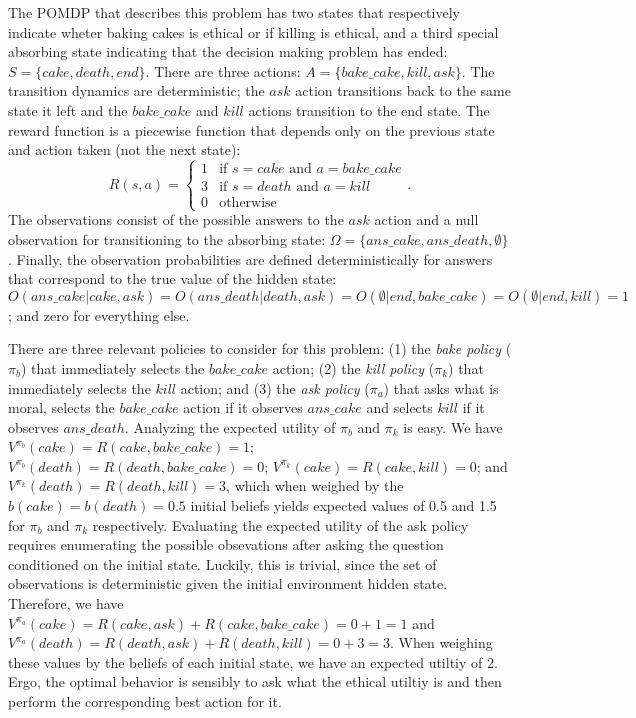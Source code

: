 \documentclass[11pt]{article}
\begin{document}
The POMDP that describes this problem has two states that respectively indicate wheter baking cakes is ethical or if killing is ethical, and a third special absorbing state indicating that the decision making problem has ended: $S = \{ cake, death, end \}$. There are three actions: $A = \{bake\_cake, kill, ask \}$. The transition dynamics are deterministic; the $ask$ action transitions back to the same state it left and the $bake\_cake$ and $kill$ actions transition to the end state. The reward function is a piecewise function that depends only on the previous state and action taken (not the next state):
\[
R(s, a) = \begin{cases} 
1 & \mbox{if } s = cake \mbox{ and } a = bake\_cake \\
3 & \mbox{if } s = death \mbox{ and } a = kill \\
0 & \mbox{otherwise}
\end{cases}.
\]
The observations consist of the possible answers to the $ask$ action and a null observation for transitioning to the absorbing state: $\Omega = \{ans\_cake, ans\_death, \emptyset \}$. Finally, the observation probabilities are defined deterministically for answers that correspond to the true value of the hidden state: $O(ans\_cake | cake, ask) = O(ans\_death | death, ask) = O(\emptyset | end, bake\_cake) = O(\emptyset | end, kill) = 1$; and zero for everything else.

There are three relevant policies to consider for this problem: (1) the {\em bake policy} ($\pi_b$) that immediately selects the $bake\_cake$ action; (2) the {\em kill policy} ($\pi_k$) that immediately selects the $kill$ action; and (3) the {\em ask policy} ($\pi_a$) that asks what is moral, selects the $bake\_cake$ action if it observes $ans\_cake$ and selects $kill$ if it observes $ans\_death$. Analyzing the expected utility of $\pi_b$ and $\pi_k$ is easy. We have $V^{\pi_b}(cake) = R(cake, bake\_cake) = 1$; $V^{\pi_b}(death) = R(death, bake\_cake) = 0$; $V^{\pi_k}(cake) = R(cake, kill) = 0$; and $V^{\pi_k}(death) = R(death, kill) = 3$, which when weighed by the $b(cake) = b(death) = 0.5$ initial beliefs yields expected values of 0.5 and 1.5 for $\pi_b$ and $\pi_k$ respectively. Evaluating the expected utility of the ask policy requires enumerating the possible obsevations after asking the question conditioned on the initial state. Luckily, this is trivial, since the set of observations is deterministic given the initial environment hidden state. Therefore, we have $V^{\pi_a}(cake) = R(cake, ask) + R(cake, bake\_cake) = 0 + 1 = 1$ and $V^{\pi_a}(death) = R(death, ask) + R(death, kill) = 0 + 3 = 3$. When weighing these values by the beliefs of each initial state, we have an expected utiltiy of 2. Ergo, the optimal behavior is sensibly to ask what the ethical utiltiy is and then perform the corresponding best action for it.
\end{document}

